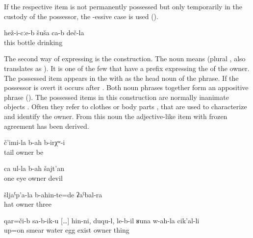 If the respective item is not permanently possessed but only temporarily in the custody of the possessor, the -essive case is used  ().
%
\begin{exe}
	\ex	\label{ex:‎‎He has a bottle with a drink}
	\gll	hež-i-cːe-b	šuša	ca-b	deč-la\\
		this	bottle		drinking\\
	\glt	{}
\end{exe}

The second way of expressing  is the  construction. The noun  means  (plural , also translates as ). It is one of the few  that have a  prefix expressing the  of the owner. The possessed item appears in the  with  as the head noun of the  phrase. If the possessor is overt it occurs after . Both noun phrases together form an appositive phrase (). The possessed items in this construction are normally inanimate objects . Often they refer to clothes  or body parts ,  that are used to characterize and identify the owner. From this noun the adjective-like item   with frozen  agreement has been derived.
%
\begin{exe}
	\ex	\label{ex:There was one with a tail}
	\gll	č'imi-la	b-ah	b-irχʷ-i\\
		tail	owner	be\\
	\glt	{}

	\ex	\label{ex:the devil with one eye}
	\gll	ca	ul-la	b-ah	šajt'an\\
		one	eye	owner	devil\\
	\glt	{}

	\ex	\label{ex:‎All three had hats}
	\gll	šljaˁp'a-la	b-ahin-te=de	ʡaˁbal-ra\\
		hat	owner	three\\
	\glt	{}

	\ex	\label{ex:‎On the upper side you smear water, egg, whatever you have}
	\gll	qar=či-b	sa-b-ik-u	[\ldots] hin-ni,	duqu-l, le-b-il	ʁuna	w-ah-la	cik'al-li\\
		up=on	smear {}	water\tsc{-erg}	egg	exist		owner	thing\\
	\glt	{}
\end{exe}
